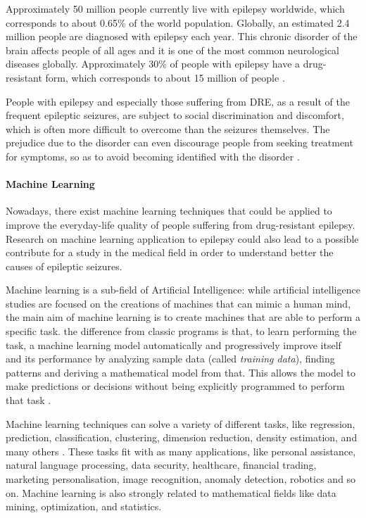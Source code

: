 Approximately 50 million people currently live with epilepsy worldwide, which corresponds to about 0.65\% of the world population. Globally, an estimated 2.4 million people are diagnosed with epilepsy each year. This chronic disorder of the brain affects people of all ages and it is one of the most common neurological diseases globally. Approximately 30\% of people with epilepsy have a drug-resistant form, which corresponds to about 15 million of people \cite{WHO:epilepsy}.

People with epilepsy and especially those suffering from DRE, as a result of the frequent epileptic seizures, are subject to social discrimination and discomfort, which is often more difficult to overcome than the seizures themselves. The prejudice due to the disorder can even discourage people from seeking treatment for symptoms, so as to avoid becoming identified with the disorder \cite{WHO:epilepsy}.

\paragraph{Machine Learning} Nowadays, there exist machine learning techniques that could be applied to improve the everyday-life quality of people suffering from drug-resistant epilepsy. Research on machine learning application to epilepsy could also lead to a possible contribute for a study in the medical field in order to understand better the causes of epileptic seizures.

Machine learning is a sub-field of Artificial Intelligence: while artificial intelligence studies are focused on the creations of machines that can mimic a human mind, the main aim of machine learning is to create machines that are able to perform a specific task. the difference from classic programs is that, to learn performing the task, a machine learning model automatically and progressively improve itself and its performance by analyzing sample data (called \textit{training data}), finding patterns and deriving a mathematical model from that. This allows the model to make predictions or decisions without being explicitly programmed to perform that task \cite{Springer:patternrecognitionandml}.

Machine learning techniques can solve a variety of different tasks, like regression, prediction, classification, clustering, dimension reduction, density estimation, and many others \cite{Springer:patternrecognitionandml}. These tasks fit with as many applications, like personal assistance, natural language processing, data security, healthcare, financial trading, marketing personalisation, image recognition, anomaly detection, robotics and so on. Machine learning is also strongly related to mathematical fields like data mining, optimization, and statistics.


